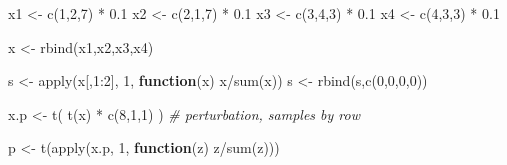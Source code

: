 \documentclass[
  onecolumn]{article}
\newenvironment{Shaded}{\begin{snugshade}}{\end{snugshade}}
\newcommand{\CommentTok}[1]{\textcolor[rgb]{0.56,0.35,0.01}{\textit{#1}}}
\newcommand{\ControlFlowTok}[1]{\textcolor[rgb]{0.13,0.29,0.53}{\textbf{#1}}}
\newcommand{\DecValTok}[1]{\textcolor[rgb]{0.00,0.00,0.81}{#1}}
\newcommand{\FloatTok}[1]{\textcolor[rgb]{0.00,0.00,0.81}{#1}}
\newcommand{\FunctionTok}[1]{\textcolor[rgb]{0.00,0.00,0.00}{#1}}
\newcommand{\NormalTok}[1]{#1}
\newcommand{\OtherTok}[1]{\textcolor[rgb]{0.56,0.35,0.01}{#1}}
\newcommand{\SpecialCharTok}[1]{\textcolor[rgb]{0.00,0.00,0.00}{#1}}
\begin{document}
\begin{Shaded}
\begin{Highlighting}[]
\NormalTok{x1 }\OtherTok{\textless{}{-}} \FunctionTok{c}\NormalTok{(}\DecValTok{1}\NormalTok{,}\DecValTok{2}\NormalTok{,}\DecValTok{7}\NormalTok{) }\SpecialCharTok{*} \FloatTok{0.1}
\NormalTok{x2 }\OtherTok{\textless{}{-}} \FunctionTok{c}\NormalTok{(}\DecValTok{2}\NormalTok{,}\DecValTok{1}\NormalTok{,}\DecValTok{7}\NormalTok{) }\SpecialCharTok{*} \FloatTok{0.1}
\NormalTok{x3 }\OtherTok{\textless{}{-}} \FunctionTok{c}\NormalTok{(}\DecValTok{3}\NormalTok{,}\DecValTok{4}\NormalTok{,}\DecValTok{3}\NormalTok{) }\SpecialCharTok{*} \FloatTok{0.1}
\NormalTok{x4 }\OtherTok{\textless{}{-}} \FunctionTok{c}\NormalTok{(}\DecValTok{4}\NormalTok{,}\DecValTok{3}\NormalTok{,}\DecValTok{3}\NormalTok{) }\SpecialCharTok{*} \FloatTok{0.1}

\NormalTok{x }\OtherTok{\textless{}{-}} \FunctionTok{rbind}\NormalTok{(x1,x2,x3,x4)}

\NormalTok{s }\OtherTok{\textless{}{-}} \FunctionTok{apply}\NormalTok{(x[,}\DecValTok{1}\SpecialCharTok{:}\DecValTok{2}\NormalTok{], }\DecValTok{1}\NormalTok{, }\ControlFlowTok{function}\NormalTok{(x) x}\SpecialCharTok{/}\FunctionTok{sum}\NormalTok{(x))}
\NormalTok{s }\OtherTok{\textless{}{-}} \FunctionTok{rbind}\NormalTok{(s,}\FunctionTok{c}\NormalTok{(}\DecValTok{0}\NormalTok{,}\DecValTok{0}\NormalTok{,}\DecValTok{0}\NormalTok{,}\DecValTok{0}\NormalTok{))}

\NormalTok{x.p }\OtherTok{\textless{}{-}} \FunctionTok{t}\NormalTok{( }\FunctionTok{t}\NormalTok{(x) }\SpecialCharTok{*} \FunctionTok{c}\NormalTok{(}\DecValTok{8}\NormalTok{,}\DecValTok{1}\NormalTok{,}\DecValTok{1}\NormalTok{) ) }\CommentTok{\# perturbation, samples by row}

\NormalTok{p }\OtherTok{\textless{}{-}} \FunctionTok{t}\NormalTok{(}\FunctionTok{apply}\NormalTok{(x.p, }\DecValTok{1}\NormalTok{, }\ControlFlowTok{function}\NormalTok{(z) z}\SpecialCharTok{/}\FunctionTok{sum}\NormalTok{(z)))}
\end{Highlighting}
\end{Shaded}
\end{document}
